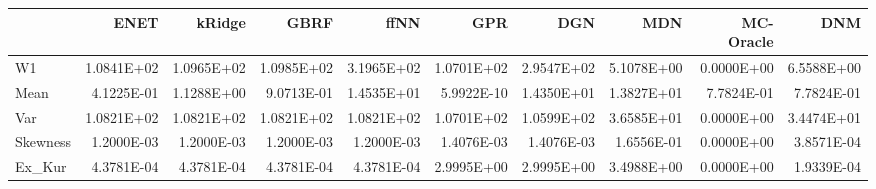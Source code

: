 \begin{tabular}{lrrrrrrrrr}
\toprule
{} &       ENET &     kRidge &       GBRF &       ffNN &        GPR &        DGN &        MDN &  MC-Oracle &        DNM \\
\midrule
W1       & 1.0841E+02 & 1.0965E+02 & 1.0985E+02 & 3.1965E+02 & 1.0701E+02 & 2.9547E+02 & 5.1078E+00 & 0.0000E+00 & 6.5588E+00 \\
Mean     & 4.1225E-01 & 1.1288E+00 & 9.0713E-01 & 1.4535E+01 & 5.9922E-10 & 1.4350E+01 & 1.3827E+01 & 7.7824E-01 & 7.7824E-01 \\
Var      & 1.0821E+02 & 1.0821E+02 & 1.0821E+02 & 1.0821E+02 & 1.0701E+02 & 1.0599E+02 & 3.6585E+01 & 0.0000E+00 & 3.4474E+01 \\
Skewness & 1.2000E-03 & 1.2000E-03 & 1.2000E-03 & 1.2000E-03 & 1.4076E-03 & 1.4076E-03 & 1.6556E-01 & 0.0000E+00 & 3.8571E-04 \\
Ex\_Kur   & 4.3781E-04 & 4.3781E-04 & 4.3781E-04 & 4.3781E-04 & 2.9995E+00 & 2.9995E+00 & 3.4988E+00 & 0.0000E+00 & 1.9339E-04 \\
\bottomrule
\end{tabular}
